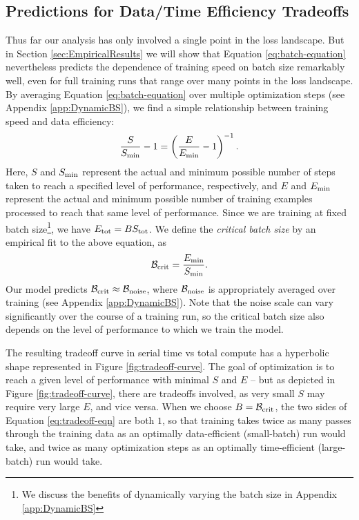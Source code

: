 \documentclass[english]{article}
\begin{document}
\subsection{Predictions for Data/Time Efficiency Tradeoffs}

\label{sec:Efficiency}

Thus far our analysis has only involved a single point in the loss landscape.  But in Section \ref{sec:EmpiricalResults} we will show that Equation \ref{eq:batch-equation} nevertheless predicts the dependence of training speed on batch size remarkably well, even for full training runs that range over many points in the loss landscape.  By averaging Equation \ref{eq:batch-equation} over multiple optimization steps (see Appendix \ref{app:DynamicBS}), we find a simple relationship between training speed and data efficiency:
\begin{equation}
\frac{S}{S_{{\rm min}}}-1  =  \left(\frac{E}{E_{{\rm min}}}-1\right)^{-1}.\label{eq:tradeoff-eqn}
\end{equation}
Here, $S$ and $S_{{\rm min}}$ represent the actual and minimum possible number of steps taken to reach a specified level of performance, respectively, and $E$ and $E_{{\rm min}}$ represent the actual and minimum possible number of training examples processed to reach that same level of performance.  Since we are training at fixed batch size\footnote{We discuss the benefits of dynamically varying the batch size in Appendix \ref{app:DynamicBS}}, we have $E_{{\rm tot}} =B S_{{\rm tot}}$.  We define the \emph{critical batch size} by an empirical fit to the above equation, as
\begin{equation}
\mathcal{B}_{{\rm crit}} = \frac{E_{{\rm min}}}{S_{{\rm min}}}.
\end{equation}
Our model predicts  $\mathcal{B}_{{\rm crit}} \approx \mathcal{B}_{{\rm noise}}$, where $\mathcal{B}_{{\rm noise}}$ is appropriately averaged over training (see Appendix \ref{app:DynamicBS}).  Note that the noise scale can vary significantly over the course of a training run, so the critical batch size also depends on the level of performance to which we train the model.

The resulting tradeoff curve in serial time vs total compute has a hyperbolic shape represented in Figure \ref{fig:tradeoff-curve}.  The goal of optimization is to reach a given level of performance with minimal $S$ and $E$ -- but as depicted in Figure \ref{fig:tradeoff-curve}, there are tradeoffs involved, as very small $S$ may require very large $E$, and vice versa.   When we choose $B = \mathcal{B}_{{\rm crit}}$, the two sides of Equation \ref{eq:tradeoff-eqn} are both $1$, so that training takes twice as many passes through the training data as an optimally data-efficient (small-batch) run would take, and twice as many optimization steps as an optimally time-efficient (large-batch) run would take.
\end{document}
